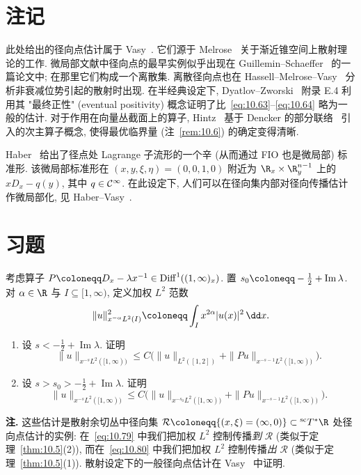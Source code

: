 \section*{注记}

此处给出的径向点估计属于 Vasy~\cite{Vas13}. 它们源于 Melrose~\cite{Mel94} 关于渐近锥空间上散射理论的工作. 微局部文献中径向点的最早实例似乎出现在 Guillemin--Schaeffer~\cite{GS77} 的一篇论文中; 在那里它们构成一个离散集. 离散径向点也在 Hassell--Melrose--Vasy~\cite{HMV08} 分析非衰减位势引起的散射时出现. 在半经典设定下, Dyatlov--Zworski~\cite{DZ19} 附录 E.4 利用其 "最终正性" (eventual positivity) 概念证明了比~\eqref{eq:10.63}--\eqref{eq:10.64} 略为一般的估计. 对于作用在向量丛截面上的算子, Hintz~\cite{Hin17} 基于 Dencker 的部分联络~\cite{Den82} 引入的次主算子概念, 使得最优临界量 (注~\ref{rem:10.6}) 的确定变得清晰.

Haber~\cite{Hab14} 给出了径点处 Lagrange 子流形的一个辛 (从而通过 FIO 也是微局部) 标准形. 该微局部标准形在 $(x, y, \xi, \eta) = (0, 0, 1, 0)$ 附近为 $\R_x \times \R_y^{n-1}$ 上的 $x D_x - q(y)$, 其中 $q \in \mathcal{C}^\infty$. 在此设定下, 人们可以在径向集内部对径向传播估计作微局部化, 见 Haber--Vasy~\cite{HV13}.


\section*{习题}

\begin{exer}[长时间能量估计]\label{ex:10.1}
考虑算子 $P \defeq D_x - \lambda x^{-1} \in \Diff^1((1, \infty)_x)$. 置 $s_0 \defeq -\frac{1}{2} + \operatorname{Im}\lambda$. 对 $\alpha \in \R$ 与 $I \subseteq [1, \infty)$, 定义加权 $L^2$ 范数
\[
    \|u\|_{x^{-\alpha}L^2(I)}^2 \defeq \int_I x^{2\alpha}|u(x)|^2 \, \dd x.
\]
\begin{enumerate}
    \item 设 $s < -\frac{1}{2} + \operatorname{Im}\lambda$. 证明
    \begin{equation}\label{eq:10.79}
        \|u\|_{x^{-s}L^2([1,\infty))} \le C\bigl(\|u\|_{L^2([1,2])} + \|P u\|_{x^{-s-1}L^2([1,\infty))}\bigr).
    \end{equation}
    \item 设 $s > s_0 > -\frac{1}{2} + \operatorname{Im}\lambda$. 证明
    \begin{equation}\label{eq:10.80}
        \|u\|_{x^{-s}L^2([1,\infty))} \le C\bigl(\|u\|_{x^{-s_0}L^2([1,\infty))} + \|P u\|_{x^{-s-1}L^2([1,\infty))}\bigr).
    \end{equation}
\end{enumerate}
\textbf{注.} 这些估计是散射余切丛中径向集 $\mathcal{R} \defeq \{(x, \xi) = (\infty, 0)\} \subset {}^{\mathrm{sc}}T^* \R$ 处径向点估计的实例: 在~\eqref{eq:10.79} 中我们把加权 $L^2$ 控制传播\emph{到} $\mathcal{R}$ (类似于定理~\ref{thm:10.5}(2)), 而在~\eqref{eq:10.80} 中我们把加权 $L^2$ 控制传播\emph{出} $\mathcal{R}$ (类似于定理~\ref{thm:10.5}(1)). 散射设定下的一般径向点估计在 Vasy~\cite{Vas13} 中证明.
\end{exer}

